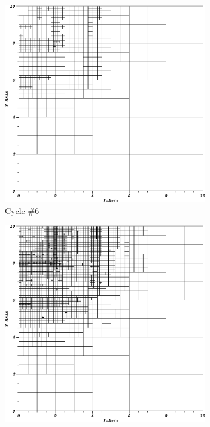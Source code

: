 \begin{figure}
\centering
	\begin{subfigure}[b]{0.485\textwidth}
		\centering
		\includegraphics[width=0.975\textwidth]{figures/sec_DSA/IW_PWLD1_LS4_cyc06.png}
		\caption{Cycle \#6}
	\end{subfigure}
	\hfill
	\begin{subfigure}[b]{0.485\textwidth}
		\centering
		\includegraphics[width=0.975\textwidth]{figures/sec_DSA/IW_PWLD1_LS4_cyc12.png}

\end{subfigure}
\end{figure}
